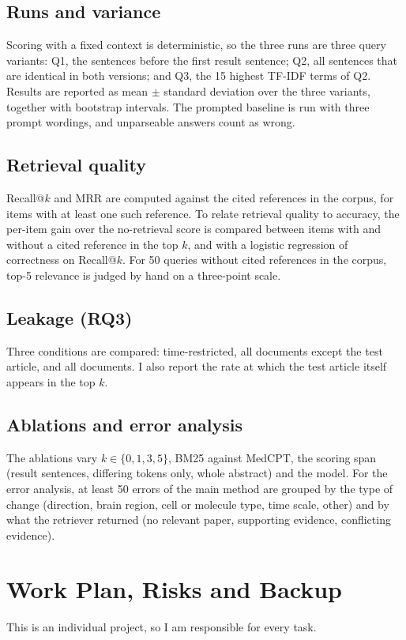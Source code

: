 \documentclass[10pt,a4paper]{article}
\begin{document}
\subsection{Runs and variance}
Scoring with a fixed context is deterministic, so the three runs are three query variants: Q1, the sentences before the first result sentence; Q2, all sentences that are identical in both versions; and Q3, the 15 highest TF-IDF terms of Q2. Results are reported as mean $\pm$ standard deviation over the three variants, together with bootstrap intervals. The prompted baseline is run with three prompt wordings, and unparseable answers count as wrong.

\subsection{Retrieval quality}
Recall@$k$ and MRR are computed against the cited references in the corpus, for items with at least one such reference. To relate retrieval quality to accuracy, the per-item gain over the no-retrieval score is compared between items with and without a cited reference in the top $k$, and with a logistic regression of correctness on Recall@$k$. For 50 queries without cited references in the corpus, top-5 relevance is judged by hand on a three-point scale.

\subsection{Leakage (RQ3)}
Three conditions are compared: time-restricted, all documents except the test article, and all documents. I also report the rate at which the test article itself appears in the top $k$.

\subsection{Ablations and error analysis}
The ablations vary $k \in \{0, 1, 3, 5\}$, BM25 against MedCPT, the scoring span (result sentences, differing tokens only, whole abstract) and the model. For the error analysis, at least 50 errors of the main method are grouped by the type of change (direction, brain region, cell or molecule type, time scale, other) and by what the retriever returned (no relevant paper, supporting evidence, conflicting evidence).

\section{Work Plan, Risks and Backup}
This is an individual project, so I am responsible for every task.
\end{document}
